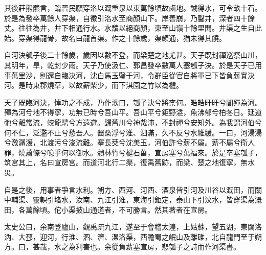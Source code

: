 其後莊熊羆言，臨晉民願穿洛以溉重泉以東萬餘頃故鹵地。誠得水，可令畝十石。於是為發卒萬餘人穿渠，自徵引洛水至商顏山下。岸善崩，乃鑿井，深者四十餘丈。往往為井，井下相通行水。水穨以絕商顏，東至山嶺十餘里閒。井渠之生自此始。穿渠得龍骨，故名曰龍首渠。作之十餘歲，渠頗通，猶未得其饒。

自河決瓠子後二十餘歲，歲因以數不登，而梁楚之地尤甚。天子既封禪巡祭山川，其明年，旱，乾封少雨。天子乃使汲仁、郭昌發卒數萬人塞瓠子決。於是天子已用事萬里沙，則還自臨決河，沈白馬玉璧于河，令群臣從官自將軍已下皆負薪窴決河。是時東郡燒草，以故薪柴少，而下淇園之竹以為楗。

天子既臨河決，悼功之不成，乃作歌曰，瓠子決兮將柰何。皓皓旰旰兮閭殫為河。殫為河兮地不得寧，功無已時兮吾山平。吾山平兮鉅野溢，魚沸郁兮柏冬日。延道弛兮離常流，蛟龍騁兮方遠遊。歸舊川兮神哉沛，不封禪兮安知外。為我謂河伯兮何不仁，泛濫不止兮愁吾人。齧桑浮兮淮、泗滿，久不反兮水維緩。一曰，河湯湯兮激潺湲，北渡污兮浚流難。搴長茭兮沈美玉，河伯許兮薪不屬。薪不屬兮衛人罪，燒蕭條兮噫乎何以御水。穨林竹兮楗石菑，宣房塞兮萬福來。於是卒塞瓠子，筑宮其上，名曰宣房宮。而道河北行二渠，復禹舊跡，而梁、楚之地復寧，無水災。

自是之後，用事者爭言水利。朔方、西河、河西、酒泉皆引河及川谷以溉田，而關中輔渠、靈軹引堵水，汝南、九江引淮，東海引鉅定，泰山下引汶水，皆穿渠為溉田，各萬餘頃。佗小渠披山通道者，不可勝言。然其著者在宣房。

太史公曰，余南登廬山，觀禹疏九江，遂至于會稽太湟，上姑蘇，望五湖，東闚洛汭、大邳，迎河，行淮、泗、濟、漯洛渠，西瞻蜀之岷山及離碓，北自龍門至于朔方。曰，甚哉，水之為利害也。余從負薪塞宣房，悲瓠子之詩而作河渠書。